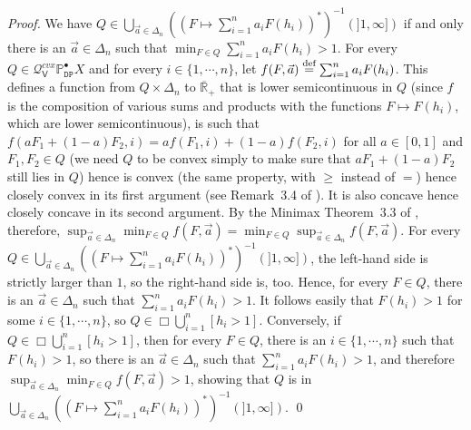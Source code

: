\documentclass[preprint,12pt]{elsarticle}
\newcommand\eqdef{\mathrel{\buildrel \text{def}\over=}}
\newcommand{\creal}{\overline{\mathbb{R}}_+}
\newcommand\Pred{\mathbb{P}}
\newcommand\Demon{{\mathtt{D}}}
\newcommand\Nature{{\mathtt{P}}}
\newcommand\DN{{\Demon\Nature}}
\newcommand\Smyth{{\mathcal Q}}
\newcommand\Vt{\mathsf{V}}
\newcommand\SV{\Smyth_{\Vt}}
\begin{document}
\begin{proof}
  We have
  $Q \in \bigcup_{\vec a \in \Delta_n} \left(\left(F \mapsto
      \sum_{i=1}^n a_i F (h_i)\right)^*\right)^{-1} (]1, \infty])$ if
  and only there is an $\vec a \in \Delta_n$ such that
  $\min_{F \in Q} \sum_{i=1}^n a_i F (h_i) > 1$.  For every
  $Q \in \SV^{cvx} {\Pred_\DN^\bullet X}$ and for every
  $i \in \{1, \cdots, n\}$, let
  $f (F, \vec a) \eqdef \sum_{i=1}^n a_i F (h_i)$.  This defines a
  function from $Q \times \Delta_n$ to $\creal$ that is lower
  semicontinuous in $Q$ (since $f$ is the composition of various sums
  and products with the functions $F \mapsto F (h_i)$, which are lower
  semicontinuous), is such that
  $f (a F_1 + (1-a) F_2, i) = a f (F_1, i) + (1-a) f (F_2, i)$ for all
  $a \in [0, 1]$ and $F_1, F_2 \in Q$ (we need $Q$ to be convex simply
  to make sure that $a F_1 + (1-a) F_2$ still lies in $Q$) hence is
  convex (the same property, with $\geq$ instead of $=$) hence closely
  convex in its first argument (see Remark~3.4 of
  \cite{JGL-minimax17}).  It is also concave hence closely concave in
  its second argument. By the Minimax Theorem~3.3 of
  \cite{JGL-minimax17}, therefore,
  $\sup_{\vec a \in \Delta_n} \min_{F \in Q} f (F, \vec a) = \min_{F
    \in Q} \sup_{\vec a \in \Delta_n} f (F, \vec a)$.  For every
  $Q \in \bigcup_{\vec a \in \Delta_n} \left(\left(F \mapsto
      \sum_{i=1}^n a_i F (h_i)\right)^*\right)^{-1} \allowbreak (]1,
  \infty])$, the left-hand side is strictly larger than $1$, so the
  right-hand side is, too.  Hence, for every $F \in Q$, there is an
  $\vec a \in \Delta_n$ such that $\sum_{i=1}^n a_i F (h_i) > 1$.  It
  follows easily that $F (h_i) > 1$ for some $i \in \{1, \cdots, n\}$,
  so $Q \in \Box {\bigcup_{i=1}^n [h_i > 1]}$.  Conversely, if
  $Q \in \Box {\bigcup_{i=1}^n [h_i > 1]}$, then for every $F \in Q$,
  there is an $i \in \{1, \cdots, n\}$ such that $F (h_i) > 1$, so
  there is an $\vec a \in \Delta_n$ such that
  $\sum_{i=1}^n a_i F (h_i) > 1$, and therefore
  $\sup_{\vec a \in \Delta_n} \min_{F \in Q} f (F, \vec a) > 1$,
  showing that $Q$ is in
  $\bigcup_{\vec a \in \Delta_n} \left(\left(F \mapsto \sum_{i=1}^n
      a_i F (h_i)\right)^*\right)^{-1} \allowbreak (]1, \infty])$.
%
  \qed
\end{proof}
\end{document}
